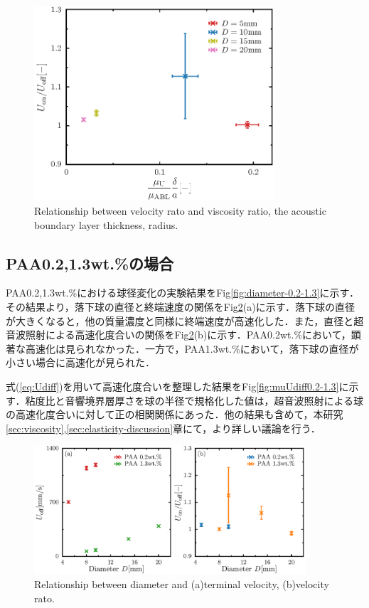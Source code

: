 \begin{figure}[ht]
    \centering
    \includegraphics[width=0.8\textwidth]{./5-Results/diameter-0.5/mu_Udiff.eps}
    \caption{Relationship between velocity rato and viscosity ratio, the acoustic boundary layer thickness, radius.}
    \label{fig:muUdiff0.5}
\end{figure}

\clearpage

\subsection{PAA0.2,1.3wt.\%の場合}
PAA0.2,1.3wt.\%における球径変化の実験結果をFig\ref{fig:diameter-0.2-1.3}に示す．その結果より，落下球の直径と終端速度の関係をFig\ref{fig:diaUT0.2-1.3}(a)に示す．落下球の直径が大きくなると，他の質量濃度と同様に終端速度が高速化した．また，直径と超音波照射による高速化度合いの関係をFig\ref{fig:diaUT0.2-1.3}(b)に示す．PAA0.2wt.\%において，顕著な高速化は見られなかった．一方で，PAA1.3wt.\%において，落下球の直径が小さい場合に高速化が見られた．

式(\ref{eq:Udiff})を用いて高速化度合いを整理した結果をFig\ref{fig:muUdiff0.2-1.3}に示す．粘度比と音響境界層厚さを球の半径で規格化した値は，超音波照射による球の高速化度合いに対して正の相関関係にあった．他の結果も含めて，本研究\ref{sec:viscosity},\ref{sec:elasticity-discussion}章にて，より詳しい議論を行う．

\begin{figure}[ht]
    \centering
    \includegraphics[width=0.9\textwidth]{./5-Results/diameter-0.2-1.3/diaUT_Udiff.eps}
    \caption{Relationship between diameter and (a)terminal velocity, (b)velocity rato.}
    \label{fig:diaUT0.2-1.3}
\end{figure}

